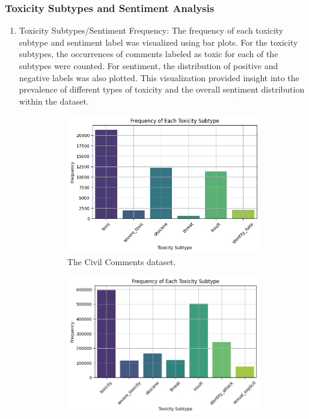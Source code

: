 \documentclass[10pt,a4paper,oneside]{article} %
\begin{document}
\subsubsection{Toxicity Subtypes and Sentiment Analysis}
\begin{enumerate}
    \item Toxicity Subtypes/Sentiment Frequency: The frequency of each toxicity subtype and sentiment label was visualized using bar plots. For the toxicity subtypes, the occurrences of comments labeled as toxic for each of the subtypes were counted. For sentiment, the distribution of positive and negative labels was also plotted. This visualization provided insight into the prevalence of different types of toxicity and the overall sentiment distribution within the dataset.
    \begin{figure}[h]
    \centering
    \begin{subfigure}{0.49\textwidth}
        \centering
        \includegraphics[width=\textwidth]{replibert/replibert/plots/Toxicity_frequency_Jigsaw.png}
        \caption{The Civil Comments dataset.}
        \label{fig:tox_freq_jigsaw}
    \end{subfigure}
    \hfill
    \begin{subfigure}{0.49\textwidth}
        \centering
        \includegraphics[width=\textwidth]{replibert/replibert/plots/Toxicity_frequency_cc.png}

\end{subfigure}
\end{figure}
\end{enumerate}
\end{document}
